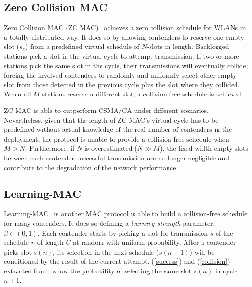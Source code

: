 \documentclass[a4paper,journal]{IEEEtran}
\begin{document}
\subsection{Zero Collision MAC} 

Zero Collision MAC (ZC MAC)~\cite{ZMAC} achieves a zero collision schedule for WLANs in a totally distributed way. It does so by allowing contenders to reserve one empty slot ($s_{e}$) from a  predefined virtual schedule of $N$-slots in length. Backlogged stations pick a slot in the virtual cycle to attempt transmission. If two or more stations pick the same slot in the cycle, their transmissions will eventually collide; forcing the involved contenders to randomly and uniformly select other empty slot from those detected in the previous cycle plus the slot where they collided. When all $M$ stations reserve a different slot, a collision-free schedule is achieved.

ZC MAC is able to outperform CSMA/CA under different scenarios. Nevertheless, given that the length of ZC MAC's virtual cycle has to be predefined without actual knowledge of the real number of contenders in the deployment, the protocol is unable to provide a collision-free schedule when $M>N$. Furthermore, if $N$ is overestimated ($N\gg M$), the fixed-width empty slots between each contender successful transmission are no longer negligible and contribute to the degradation of the network performance.


\subsection{Learning-MAC}

Learning-MAC~\cite{L_MAC} is another MAC protocol is able to build a collision-free schedule for many contenders. It does so defining a \emph{learning strength} parameter, $\beta\in(0,1)$. Each contender starts by picking a slot for transmission $s$ of the schedule $n$ of length $C$ at random with uniform probability. After a contender picks slot $s(n)$, its selection in the next schedule ($s(n+1)$) will be conditioned by the result of the current attempt. (\ref{success}) and (\ref{collision}) extracted from~\cite{L_MAC} show the probability of selecting the same slot $s(n)$ in cycle $n+1$.
\end{document}
